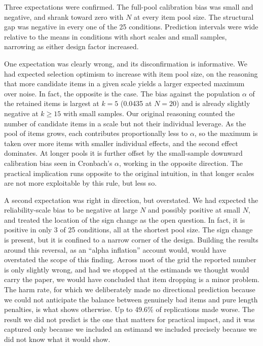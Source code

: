 \documentclass[
  nonatbib,
  authoryear,
  preprint]{elsarticle}
\begin{document}
Three expectations were confirmed. The full-pool calibration bias was
small and negative, and shrank toward zero with \(N\) at every item pool
size. The structural gap was negative in every one of the 25 conditions.
Prediction intervals were wide relative to the means in conditions with
short scales and small samples, narrowing as either design factor
increased.

One expectation was clearly wrong, and its disconfirmation is
informative. We had expected selection optimism to increase with item
pool size, on the reasoning that more candidate items in a given scale
yields a larger expected maximum over noise. In fact, the opposite is
the case. The bias against the population \(\alpha\) of the retained
items is largest at \(k = 5\) (0.0435 at \(N = 20\)) and is already
slightly negative at \(k \geq 15\) with small samples. Our original
reasoning counted the number of candidate items in a scale but not their
individual leverage. As the pool of items grows, each contributes
proportionally less to \(\alpha\), so the maximum is taken over more
items with smaller individual effects, and the second effect dominates.
At longer pools it is further offset by the small-sample downward
calibration bias seen in Cronbach's \(\alpha\), working in the opposite
direction. The practical implication runs opposite to the original
intuition, in that longer scales are not more exploitable by this rule,
but less so.

A second expectation was right in direction, but overstated. We had
expected the reliability-scale bias to be negative at large \(N\) and
possibly positive at small \(N\), and treated the location of the sign
change as the open question. In fact, it is positive in only 3 of 25
conditions, all at the shortest pool size. The sign change is present,
but it is confined to a narrow corner of the design. Building the
results around this reversal, as an ``alpha inflation'' account would,
would have overstated the scope of this finding. Across most of the grid
the reported number is only slightly wrong, and had we stopped at the
estimands we thought would carry the paper, we would have concluded that
item dropping is a minor problem. The harm rate, for which we
deliberately made no directional prediction because we could not
anticipate the balance between genuinely bad items and pure length
penalties, is what shows otherwise. Up to 49.6\% of replications made
worse. The result we did not predict is the one that matters for
practical impact, and it was captured only because we included an
estimand we included precisely because we did not know what it would
show.
\end{document}
